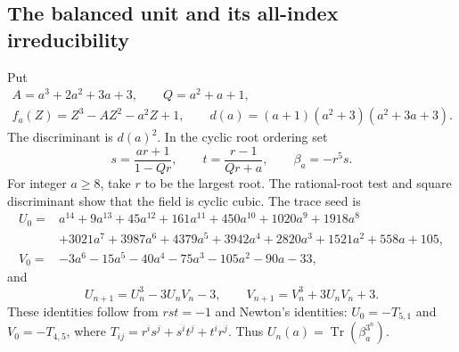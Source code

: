 \documentclass[11pt,a4paper]{article}
\theoremstyle{remark}\newtheorem{remark}[theorem]{Remark}
\begin{document}
\subsection{The balanced unit and its all-index irreducibility}
Put
\[
\begin{gathered}
A=a^3+2a^2+3a+3,\qquad Q=a^2+a+1,\\
f_a(Z)=Z^3-AZ^2-a^2Z+1,\qquad
d(a)=(a+1)(a^2+3)(a^2+3a+3).\end{gathered}
\]
The discriminant is $d(a)^2$. In the cyclic root ordering set
\[
 s=\frac{ar+1}{1-Qr},\qquad t=\frac{r-1}{Qr+a},
 \qquad\beta_a=-r^5s.
\]
For integer $a\ge8$, take $r$ to be the largest root. The rational-root
test and square discriminant show that the field is cyclic cubic.
The trace seed is
\begin{align*}
 U_0={}&a^{14}+9a^{13}+45a^{12}+161a^{11}+450a^{10}
 +1020a^9+1918a^8\\
 &+3021a^7+3987a^6+4379a^5+3942a^4+2820a^3
 +1521a^2+558a+105,\\
 V_0={}&-3a^6-15a^5-40a^4-75a^3-105a^2-90a-33,
\end{align*}
and
\begin{equation}\label{fac:rec}
 U_{n+1}=U_n^3-3U_nV_n-3,\qquad
 V_{n+1}=V_n^3+3U_nV_n+3.
\end{equation}
These identities follow from $rst=-1$ and Newton's identities:
$U_0=-T_{5,1}$ and $V_0=-T_{4,5}$, where
$T_{ij}=r^is^j+s^it^j+t^ir^j$. Thus
$U_n(a)=\operatorname{Tr}(\beta_a^{3^n})$.
\end{document}
